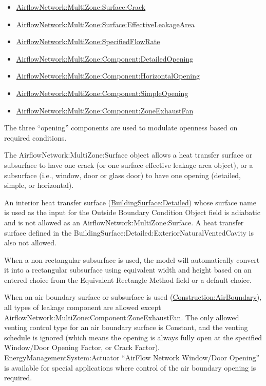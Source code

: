 \begin{itemize}
\item
  \hyperref[airflownetworkmultizonesurfacecrack]{AirflowNetwork:MultiZone:Surface:Crack}
\item
  \hyperref[airflownetworkmultizonesurfaceeffectiveleakagearea]{AirflowNetwork:MultiZone:Surface:EffectiveLeakageArea}
\item
  \hyperref[airflownetworkmultizonespecifiedflow]{AirflowNetwork:MultiZone:SpecifiedFlowRate}
\item
  \hyperref[airflownetworkmultizonecomponentdetailedopening]{AirflowNetwork:MultiZone:Component:DetailedOpening}
\item
  \hyperref[airflownetworkmultizonecomponenthorizontalopening]{AirflowNetwork:MultiZone:Component:HorizontalOpening}
\item
  \hyperref[airflownetworkmultizonecomponentsimpleopening]{AirflowNetwork:MultiZone:Component:SimpleOpening}
\item
  \hyperref[airflownetworkmultizonecomponentzoneexhaustfan]{AirflowNetwork:MultiZone:Component:ZoneExhaustFan}
\end{itemize}

The three ``opening'' components are used to modulate openness based on required conditions.

The AirflowNetwork:MultiZone:Surface object allows a heat transfer surface or subsurface to have one crack (or one surface effective leakage area object), or a subsurface (i.e., window, door or glass door) to have one opening (detailed, simple, or horizontal).


An interior heat transfer surface (\hyperref[buildingsurfacedetailed]{BuildingSurface:Detailed}) whose surface name is used as the input for the Outside Boundary Condition Object field is adiabatic and is not allowed as an AirflowNetwork:MultiZone:Surface. A heat transfer surface defined in the BuildingSurface:Detailed:ExteriorNaturalVentedCavity is also not allowed.

When a non-rectangular subsurface is used, the model will automatically convert it into a rectangular subsurface using equivalent width and height based on an entered choice from the Equivalent Rectangle Method field or a default choice.

When an air boundary surface or subsurface is used (\hyperref[constructionairboundary]{Construction:AirBoundary}), all types of leakage component are allowed except AirflowNetwork:MultiZone:Component:ZoneExhaustFan. The only allowed venting control type for an air boundary surface is Constant, and the venting schedule is ignored (which means the opening is always fully open at the specified Window/Door Opening Factor, or Crack Factor). EnergyManagementSystem:Actuator ``AirFlow Network Window/Door Opening'' is available for special applications where control of the air boundary opening is required.


